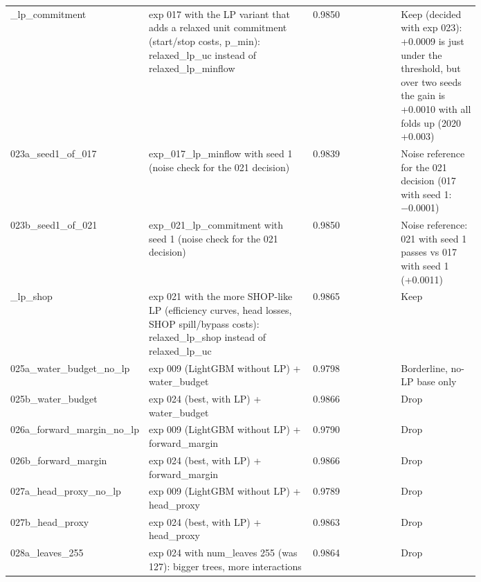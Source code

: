 \begin{longtable}{>{\raggedright\arraybackslash}p{0.16\linewidth}>{\raggedright\arraybackslash}p{0.35\linewidth}l>{\raggedright\arraybackslash}p{0.11\linewidth}>{\raggedright\arraybackslash}p{0.17\linewidth}}
021\_\allowbreak{}lp\_\allowbreak{}commitment & exp 017 with the LP variant that adds a relaxed unit commitment (start/stop costs, p\_\allowbreak{}min): relaxed\_\allowbreak{}lp\_\allowbreak{}uc instead of relaxed\_\allowbreak{}lp\_\allowbreak{}minflow & 0.9850 & 0.99067 & Keep (decided with exp 023): +0.0009 is just under the threshold, but over two seeds the gain is +0.0010 with all folds up (2020 +0.003) \\
023a\_\allowbreak{}seed1\_\allowbreak{}of\_\allowbreak{}017 & exp\_\allowbreak{}017\_\allowbreak{}lp\_\allowbreak{}minflow with seed 1 (noise check for the 021 decision) & 0.9839 &  & Noise reference for the 021 decision (017 with seed 1: −0.0001) \\
023b\_\allowbreak{}seed1\_\allowbreak{}of\_\allowbreak{}021 & exp\_\allowbreak{}021\_\allowbreak{}lp\_\allowbreak{}commitment with seed 1 (noise check for the 021 decision) & 0.9850 &  & Noise reference: 021 with seed 1 passes vs 017 with seed 1 (+0.0011) \\
024\_\allowbreak{}lp\_\allowbreak{}shop & exp 021 with the more SHOP-like LP (efficiency curves, head losses, SHOP spill/bypass costs): relaxed\_\allowbreak{}lp\_\allowbreak{}shop instead of relaxed\_\allowbreak{}lp\_\allowbreak{}uc & 0.9865 & 0.99099 & Keep \\
025a\_\allowbreak{}water\_\allowbreak{}budget\_\allowbreak{}no\_\allowbreak{}lp & exp 009 (LightGBM without LP) + water\_\allowbreak{}budget & 0.9798 &  & Borderline, no-LP base only \\
025b\_\allowbreak{}water\_\allowbreak{}budget & exp 024 (best, with LP) + water\_\allowbreak{}budget & 0.9866 &  & Drop \\
026a\_\allowbreak{}forward\_\allowbreak{}margin\_\allowbreak{}no\_\allowbreak{}lp & exp 009 (LightGBM without LP) + forward\_\allowbreak{}margin & 0.9790 &  & Drop \\
026b\_\allowbreak{}forward\_\allowbreak{}margin & exp 024 (best, with LP) + forward\_\allowbreak{}margin & 0.9866 &  & Drop \\
027a\_\allowbreak{}head\_\allowbreak{}proxy\_\allowbreak{}no\_\allowbreak{}lp & exp 009 (LightGBM without LP) + head\_\allowbreak{}proxy & 0.9789 &  & Drop \\
027b\_\allowbreak{}head\_\allowbreak{}proxy & exp 024 (best, with LP) + head\_\allowbreak{}proxy & 0.9863 &  & Drop \\
028a\_\allowbreak{}leaves\_\allowbreak{}255 & exp 024 with num\_\allowbreak{}leaves 255 (was 127): bigger trees, more interactions & 0.9864 &  & Drop \\

\end{longtable}
